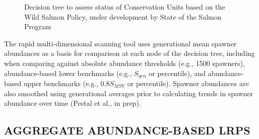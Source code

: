 \documentclass[11pt]{book}
\begin{document}
\newpage
\begin{landscape}
\begin{figure}[htb]

{\centering {} 

}

\caption{Decision tree to assess status of Conservation Units based on the Wild Salmon Policy, under development by State of the Salmon Program}\label{fig:decision-tree}
\end{figure}
\end{landscape}
The rapid multi-dimensional scanning tool uses generational mean spawner abundances as a basis for comparison at each node of the decision tree, including when comparing against absolute abundance thresholds (e.g., 1500 spawners), abundance-based lower benchmarks (e.g., \(S_{gen}\) or percentile), and abundance-based upper benchmarks (e.g., 0.8\(S_{MSY}\) or percentile). Spawner abundances are also smoothed using generational averages prior to calculating trends in spawner abundance over time (Pestal et al., in prep).

\hypertarget{aggAbundMethods}{%
\subsection{AGGREGATE ABUNDANCE-BASED LRPS}\label{aggAbundMethods}}
\end{document}
